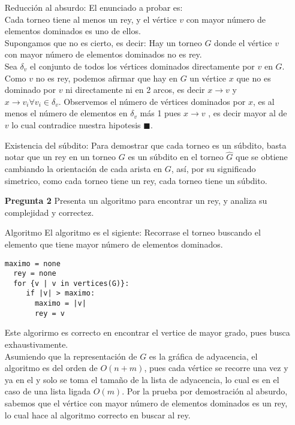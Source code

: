 \documentclass[12pt]{article}
\begin{document}
\begin{itemize}
  \item[Reducción al absurdo:]
    El enunciado a probar es: \\
Cada torneo tiene al menos un rey, y el vértice $v$ con mayor número de elementos dominados es uno de ellos.\\
    Supongamos que no es cierto, es decir: Hay un torneo $G$ donde el vértice $v$ con mayor número de elementos dominados no es rey. \\
    Sea $\delta_{v}$ el conjunto de todos los vértices dominados directamente por $v$ en $G$.\\
    Como $v$ no es rey, podemos afirmar que hay en $G$ un vértice $x$ que no es dominado por $v$ ni directamente ni en 2 arcos, es decir $ x \rightarrow v$  y 
$ x \rightarrow v_{i} \forall v_{i} \in \delta_{v} $. Observemos el número de vértices dominados por $x$, es al menos el número de elementos en $\delta_{v}$ más 1  pues $x \rightarrow v$ , es decir mayor al de $v$ lo cual contradice nuestra hipotesis  $\blacksquare$.\\

\item[Existencia del súbdito:]
Para demostrar que cada torneo es un súbdito, basta notar que un rey en un torneo $G$ es un súbdito en el torneo $\widehat G$ que se obtiene cambiando la orientación de cada arista en $G$, así, por su significado simetrico, como cada torneo tiene un rey, cada torneo tiene un súbdito.\\

\item[\bf{Pregunta 2}] Presenta un algoritmo para encontrar un rey, y analiza su complejidad y
correctez.

\item[Algoritmo]
  El algoritmo es el sigiente:
  Recorrase el torneo buscando el elemento que tiene mayor número de elementos dominados.

\begin{lstlisting}[frame=single] 
  maximo = none
  rey = none
  for {v | v in vertices(G)}:
     if |v| > maximo:
       maximo = |v|
       rey = v
\end{lstlisting}
Este algorirmo es correcto en encontrar el vertice de mayor grado, pues busca exhaustivamente.\\
Asumiendo que la representación de $G$ es la gráfica de adyacencia, el algoritmo es del orden de $O(n + m)$, pues cada vértice se recorre una vez y ya en el y solo se toma el tamaño de la lista de adyacencia, lo cual es en el caso de una lista ligada $O(m)$.
Por la prueba por demostración al absurdo, sabemos que el vértice con mayor número de elementos dominados es un rey, lo cual hace al algoritmo correcto en buscar al rey.


\end{itemize}
\end{document}
